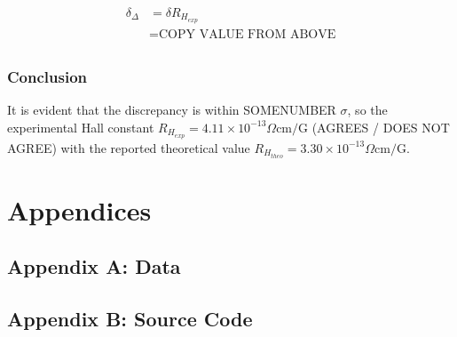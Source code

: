 \documentclass[a4paper]{article}
\begin{document}
\begin{align*}
\delta_{\Delta} &= \delta R_{H_{exp}} \\
				&= \text{COPY VALUE FROM ABOVE} \\
\end{align*}

\subsubsection{Conclusion}
It is evident that the discrepancy is within SOMENUMBER $\sigma$, so the experimental Hall constant $R_{H_{exp}} = 4.11 \times 10^{-13} \Omega \text{cm/G}$ (AGREES / DOES NOT AGREE) with the reported theoretical value $R_{H_{theo}} = 3.30 \times 10^{-13} \Omega \text{cm/G}$.

\section{Appendices}

\subsection{Appendix A: Data}

\subsection{Appendix B: Source Code}
\end{document}
